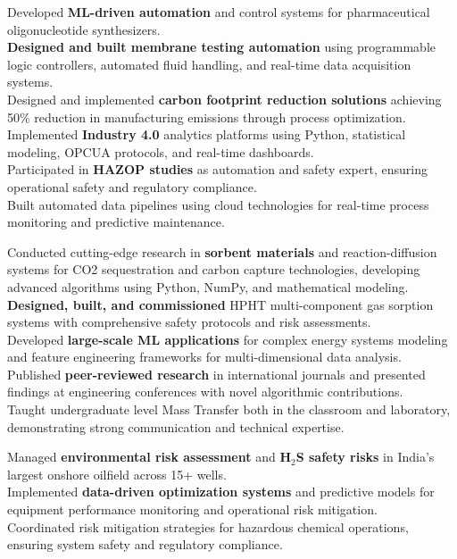 \documentclass{../templates/karthicv-single}
\begin{document}
{Developed \textbf{ML-driven automation} and control systems for pharmaceutical oligonucleotide synthesizers.\\
\textbf{Designed and built membrane testing automation} using programmable logic controllers, automated fluid handling, and real-time data acquisition systems.\\
Designed and implemented \textbf{carbon footprint reduction solutions} achieving 50\% reduction in manufacturing emissions through process optimization.\\
Implemented \textbf{Industry 4.0} analytics platforms using Python, statistical modeling, OPCUA protocols, and real-time dashboards.\\
Participated in \textbf{HAZOP studies} as automation and safety expert, ensuring operational safety and regulatory compliance.\\
Built automated data pipelines using cloud technologies for real-time process monitoring and predictive maintenance.}

{Conducted cutting-edge research in \textbf{sorbent materials} and reaction-diffusion systems for CO2 sequestration and carbon capture technologies, developing advanced algorithms using Python, NumPy, and mathematical modeling. \\
\textbf{Designed, built, and commissioned} HPHT multi-component gas sorption systems with comprehensive safety protocols and risk assessments.\\
Developed \textbf{large-scale ML applications} for complex energy systems modeling and feature engineering frameworks for multi-dimensional data analysis.\\
Published \textbf{peer-reviewed research} in international journals and presented findings at engineering conferences with novel algorithmic contributions.\\
Taught undergraduate level Mass Transfer both in the classroom and laboratory, demonstrating strong communication and technical expertise.}

{Managed \textbf{environmental risk assessment} and \textbf{H$_2$S safety risks} in India's largest onshore oilfield across 15+ wells.\\
Implemented \textbf{data-driven optimization systems} and predictive models for equipment performance monitoring and operational risk mitigation.\\
Coordinated risk mitigation strategies for hazardous chemical operations, ensuring system safety and regulatory compliance.}
\end{document}
